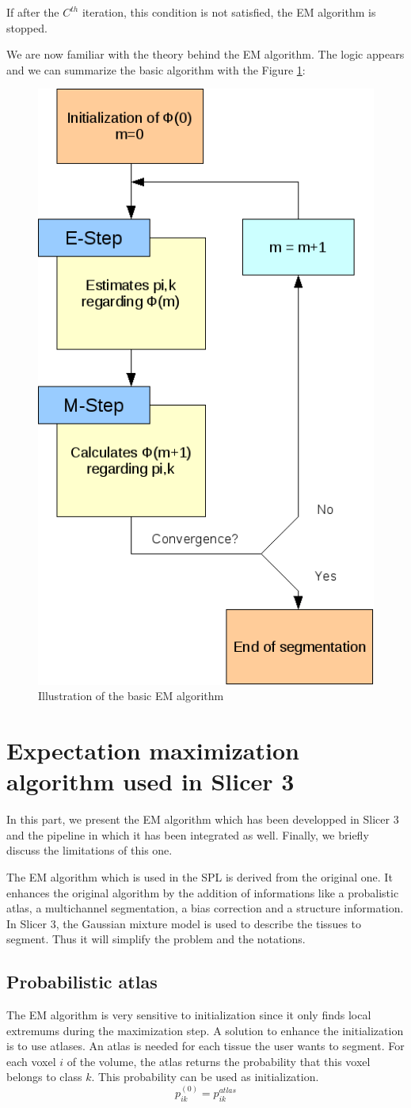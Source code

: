If after the $C^{th}$ iteration, this condition is not satisfied, the EM algorithm is stopped. \\

 
  \par
  We are now familiar with the theory behind the EM algorithm. The logic appears and we can summarize the basic algorithm with the Figure \ref{fig:EMAlgorithm}:
   
  \begin{figure}[ht]\centering
  \includegraphics[width=.4\textwidth]{Images/Graphics/EMSimple.png}
  \caption{Illustration of the basic EM algorithm}\label{fig:EMAlgorithm}
  \end{figure}

\section{Expectation maximization algorithm used in Slicer 3}\label{angels}
In this part, we present the EM algorithm which has been developped in Slicer 3 and the pipeline in which it has been integrated as well. Finally, we briefly discuss the limitations of this one.
\par
The EM algorithm which is used in the SPL is derived from the original one. It enhances the original algorithm by the addition of informations like a probalistic atlas, a multichannel segmentation, a bias correction and a structure information. In Slicer 3, the Gaussian mixture model is used to describe the tissues to segment. Thus it will simplify the problem and the notations.
%
\subsection{Probabilistic atlas}\label{spatial}
The EM algorithm is very sensitive to initialization since it only finds local extremums during the maximization step. A solution to enhance the initialization is to use atlases. An atlas is needed for each tissue the user wants to segment. For each voxel $i$ of the volume, the atlas returns the probability that this voxel belongs to class $k$. This probability can be used as initialization.
  \begin{equation*}
  p_{ik}^{(0)} = p_{ik}^{atlas}
  \end{equation*}   

